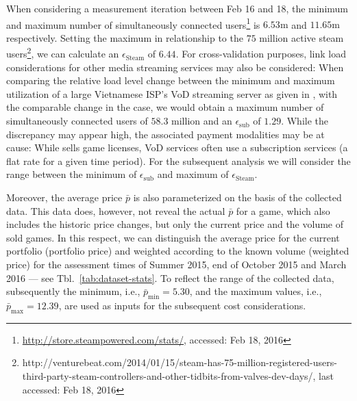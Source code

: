 

When considering a measurement iteration between Feb 16 and 18, the minimum and maximum number of simultaneously connected users\footnote{\url{http://store.steampowered.com/stats/}, accessed: Feb 18, 2016} is $6.53\text{m}$ and $11.65\text{m}$ respectively. Setting the maximum in relationship to the $75$ million active steam users\footnote{http://venturebeat.com/2014/01/15/steam-has-75-million-registered-users-third-party-steam-controllers-and-other-tidbits-from-valves-dev-days/, last accessed: Feb 18, 2016}, we can calculate an $\epsilon_{\text{Steam}}$ of $6.44$. For cross-validation purposes, link load considerations for other media streaming services may also be considered: When comparing the relative load level change between the minimum and maximum utilization of a large Vietnamese \acrshort{ISP}'s \gls{VoD} streaming server as given in \cite{thanh2012enabling}%
, with the comparable change in the case, we would obtain a maximum number of simultaneously connected users of $58.3$ million and an $\epsilon_{\text{sub}}$ of $1.29$. While the discrepancy may appear high, the associated payment modalities may be at cause: While \steam sells game licenses, \gls{VoD} services often use a subscription services (a flat rate for a given time period). For the subsequent analysis we will consider the range between the minimum of $\epsilon_{\text{sub}}$ and maximum of $\epsilon_{\text{Steam}}$.

Moreover, the average price $\bar{p}$ is also parameterized on the basis of the collected \steam data. This data does, however, not reveal the actual $\bar{p}$ for a game, which also includes the historic price changes, but only the current price and the volume of sold games. In this respect, we can distinguish the average price for the current portfolio (portfolio price) and weighted according to the known volume (weighted price) for the assessment times of Summer 2015, end of October 2015 and March 2016 --- see Tbl.~\ref{tab:dataset-stats}. To reflect the range of the collected data, subsequently the minimum, i.e., $\bar{p}_{\text{min}} = 5.30$, and the maximum values, i.e., $\bar{p}_{\text{max}} = 12.39$, are used as inputs for the subsequent cost considerations.

